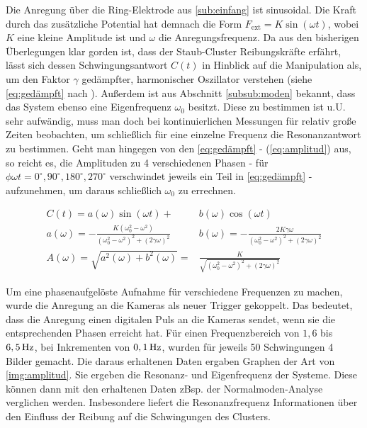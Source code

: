 \documentclass[numbers=noenddot,a4paper,notitlepage,twoside,BCOR15mm]{scrbook}
\newcommand{\degree}{^\circ}
\newcommand{\ix}[1]{_\text{#1}}
\begin{document}
			Die Anregung über die Ring-Elektrode aus \ref{sub:einfang} ist sinusoidal. Die Kraft durch das zusätzliche Potential hat demnach die Form $F\ix{ext}=K\sin\left(\omega t\right)$, wobei $K$ eine kleine Amplitude ist und $\omega$ die Anregungsfrequenz. Da aus den bisherigen Überlegungen klar gorden ist, dass der Staub-Cluster Reibungskräfte erfährt, lässt sich dessen Schwingungsantwort $C\left(t\right)$ in Hinblick auf die Manipulation als, um den Faktor $\gamma$ gedämpfter, harmonischer Oszillator verstehen (siehe \autoref{eq:gedämpft} nach \cite{Carstensen11}). Außerdem ist aus Abschnitt \ref{subsub:moden} bekannt, dass das System ebenso eine Eigenfrequenz $\omega\ix{0}$ besitzt. Diese zu bestimmen ist u.U. sehr aufwändig, muss man doch bei kontinuierlichen Messungen für relativ große Zeiten beobachten, um schließlich für eine einzelne Frequenz die Resonanzantwort zu bestimmen. Geht man hingegen von den \autoref{eq:gedämpft} - (\ref{eq:amplitud}) aus, so reicht es, die Amplituden zu 4 verschiedenen Phasen - für $\phi\omega t=0\degree,90\degree,180\degree,270\degree$ verschwindet jeweils ein Teil in \autoref{eq:gedämpft} - aufzunehmen, um daraus schließlich $\omega\ix{0}$ zu errechnen.

				\begin{align}
					C\left(t\right)=a\left(\omega\right)\sin\left(\omega t\right)+&b\left(\omega\right)\cos\left(\omega t\right) \label{eq:gedämpft} \\
					a\left(\omega\right)=-\frac{K\left(\omega\ix{0}^2-\omega^2\right)}{\left(\omega\ix{0}^2-\omega^2\right)^2+\left(2\gamma\omega\right)^2} \quad& b\left(\omega\right)=-\frac{2K\gamma\omega}{\left(\omega\ix{0}^2-\omega^2\right)^2+\left(2\gamma\omega\right)^2} \\
					A\left(\omega\right)=\sqrt{a^2\left(\omega\right)+b^2\left(\omega\right)}=&\frac{K}{\sqrt{\left(\omega\ix{0}^2-\omega^2\right)^2+\left(2\gamma\omega\right)^2}} \label{eq:amplitud}
				\end{align}

	\newpage

			Um eine phasenaufgelöste Aufnahme für verschiedene Frequenzen zu machen, wurde die Anregung an die Kameras als neuer Trigger gekoppelt. Das bedeutet, dass die Anregung einen digitalen Puls an die Kameras sendet, wenn sie die entsprechenden Phasen erreicht hat. Für einen Frequenzbereich von $1,6$ bis $\unit[6,5]{Hz}$, bei Inkrementen von $\unit[0,1]{Hz}$, wurden für jeweils 50 Schwingungen 4 Bilder gemacht. Die daraus erhaltenen Daten ergaben Graphen der Art von \autoref{img:amplitud}. Sie ergeben die Resonanz- und Eigenfrequenz der Systeme. Diese können dann mit den erhaltenen Daten zBsp. der Normalmoden-Analyse verglichen werden. Insbesondere liefert die Resonanzfrequenz Informationen über den Einfluss der Reibung auf die Schwingungen des Clusters.
\end{document}
